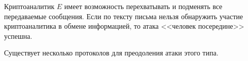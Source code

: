 Криптоаналитик $E$ имеет возможность перехватывать и подменять все передаваемые сообщения. Если по тексту письма нельзя обнаружить участие криптоаналитика в обмене информацией, то атака <<человек посередине>> успешна.

Существует несколько протоколов для преодоления атаки этого типа.
